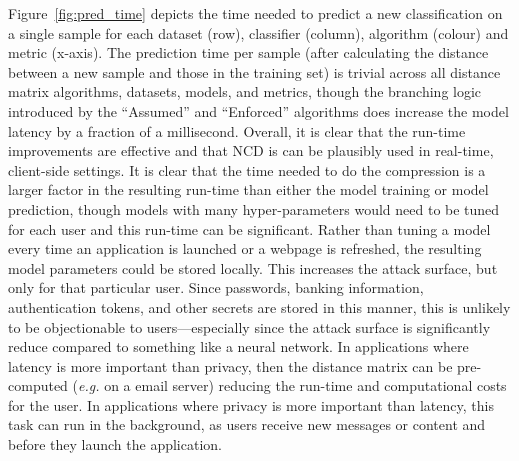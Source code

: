 \documentclass[preprint,12pt]{elsarticle}
\begin{document}
Figure~\ref{fig:pred_time} depicts the time needed to predict a new classification on a single sample for each dataset (row), classifier (column), algorithm (colour) and metric (x-axis).
The prediction time per sample (after calculating the distance between a new sample and those in the training set) is trivial across all distance matrix algorithms, datasets, models, and metrics, though the branching logic introduced by the ``Assumed'' and ``Enforced'' algorithms does increase the model latency by a fraction of a millisecond.
Overall, it is clear that the run-time improvements are effective and that NCD is can be plausibly used in real-time, client-side settings.
It is clear that the time needed to do the compression is a larger factor in the resulting run-time than either the model training or model prediction, though models with many hyper-parameters would need to be tuned for each user and this run-time can be significant.
Rather than tuning a model every time an application is launched or a webpage is refreshed, the resulting model parameters could be stored locally.
This increases the attack surface, but only for that particular user.
Since passwords, banking information, authentication tokens, and other secrets are stored in this manner, this is unlikely to be objectionable to users---especially since the attack surface is significantly reduce compared to something like a neural network.
In applications where latency is more important than privacy, then the distance matrix can be pre-computed (\textit{e.g.} on a email server) reducing the run-time and computational costs for the user.
In applications where privacy is more important than latency, this task can run in the background, as users receive new messages or content and before they launch the application.


\end{document}
